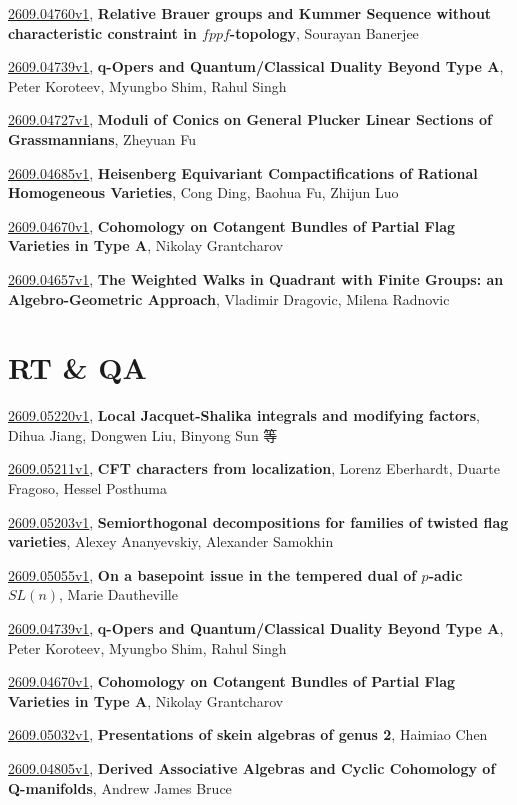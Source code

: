 \documentclass[9pt, a4paper]{article}
\theoremstyle{plain}
\theoremstyle{definition}
\theoremstyle{remark}
\newcommand{\arxiv}[3]{\href{https://arxiv.org/abs/#1}{#1}, \textbf{\textcolor{arxivblue}{#2}}, #3}
\begin{document}
\arxiv{2609.04760v1}{Relative Brauer groups and Kummer Sequence without characteristic constraint in $fppf$-topology}{Sourayan Banerjee}

\arxiv{2609.04739v1}{q-Opers and Quantum/Classical Duality Beyond Type A}{Peter Koroteev, Myungbo Shim, Rahul Singh}

\arxiv{2609.04727v1}{Moduli of Conics on General Plucker Linear Sections of Grassmannians}{Zheyuan Fu}

\arxiv{2609.04685v1}{Heisenberg Equivariant Compactifications of Rational Homogeneous Varieties}{Cong Ding, Baohua Fu, Zhijun Luo}

\arxiv{2609.04670v1}{Cohomology on Cotangent Bundles of Partial Flag Varieties in Type A}{Nikolay Grantcharov}

\arxiv{2609.04657v1}{The Weighted Walks in Quadrant with Finite Groups: an Algebro-Geometric Approach}{Vladimir Dragovic, Milena Radnovic}


\section{RT \& QA}
\arxiv{2609.05220v1}{Local Jacquet-Shalika integrals and modifying factors}{Dihua Jiang, Dongwen Liu, Binyong Sun 等}

\arxiv{2609.05211v1}{CFT characters from localization}{Lorenz Eberhardt, Duarte Fragoso, Hessel Posthuma}

\arxiv{2609.05203v1}{Semiorthogonal decompositions for families of twisted flag varieties}{Alexey Ananyevskiy, Alexander Samokhin}

\arxiv{2609.05055v1}{On a basepoint issue in the tempered dual of $p$-adic $SL(n)$}{Marie Dautheville}

\arxiv{2609.04739v1}{q-Opers and Quantum/Classical Duality Beyond Type A}{Peter Koroteev, Myungbo Shim, Rahul Singh}

\arxiv{2609.04670v1}{Cohomology on Cotangent Bundles of Partial Flag Varieties in Type A}{Nikolay Grantcharov}

\arxiv{2609.05032v1}{Presentations of skein algebras of genus 2}{Haimiao Chen}

\arxiv{2609.04805v1}{Derived Associative Algebras and Cyclic Cohomology of Q-manifolds}{Andrew James Bruce}

\end{document}
